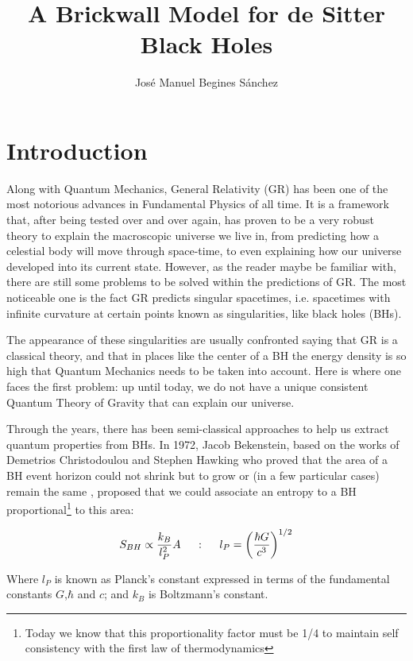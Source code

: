 \documentclass[11pt,a4paper]{article}
\title{A Brickwall Model for de Sitter Black Holes}
\author{José Manuel Begines Sánchez}
\begin{document}


\tableofcontents

%    

\section{Introduction}\label{label1}

Along with Quantum Mechanics, General Relativity (GR) has been one of the most notorious advances in Fundamental Physics of all time. It is a framework that, after being tested over and over again, has proven to be a very robust theory to explain the macroscopic universe we live in, from predicting how a celestial body will move through space-time, to even explaining how our universe developed into its current state. However, as the reader maybe be familiar with, there are still some problems to be solved within the predictions of GR. The most noticeable one is the fact GR predicts singular spacetimes, i.e. spacetimes with infinite curvature at certain points known as singularities, like black holes (BHs).

The appearance of these singularities are usually confronted saying that GR is a classical theory, and that in places like the center of a BH the energy density is so high that Quantum Mechanics needs to be taken into account. Here is where one faces the first problem: up until today, we do not have a unique consistent Quantum Theory of Gravity that can explain our universe.

Through the years, there has been semi-classical approaches to help us extract quantum properties from BHs. In 1972, Jacob Bekenstein, based on the works of Demetrios Christodoulou and Stephen Hawking who proved that the area of a BH event horizon could not shrink but to grow or (in a few particular cases) remain the same \cite{Hawking:1971tu,Christodoulou:1971pcn}, proposed that we could associate an entropy to a BH proportional\footnote{Today we know that this proportionality factor must be 1/4 to maintain self consistency with the first law of thermodynamics} to this area:

\begin{equation}\LA{SBH}
    S_{BH}\propto \frac{k_B}{l_P^2}A ~~~~:~~~~ l_P=\left(\frac{\hbar G}{c^3}\right)^{1/2}
\end{equation}

Where $l_P$ is known as Planck's constant expressed in terms of the fundamental constants $G$,$\hbar$ and $c$; and $k_B$ is Boltzmann's constant. 
\end{document}
